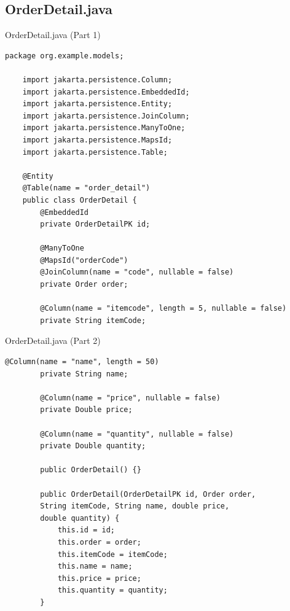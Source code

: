 \documentclass[aspectratio=169, table]{beamer}
\begin{document}
\subsection{OrderDetail.java}
\begin{frame}[fragile]{OrderDetail.java (Part 1)}
\vspace{20pt}
\begin{lstlisting}[style=JavaStyle]
	package org.example.models;
	
	import jakarta.persistence.Column;
	import jakarta.persistence.EmbeddedId;
	import jakarta.persistence.Entity;
	import jakarta.persistence.JoinColumn;
	import jakarta.persistence.ManyToOne;
	import jakarta.persistence.MapsId;
	import jakarta.persistence.Table;
	
	@Entity
	@Table(name = "order_detail")
	public class OrderDetail {
		@EmbeddedId
		private OrderDetailPK id;
		
		@ManyToOne
		@MapsId("orderCode")
		@JoinColumn(name = "code", nullable = false)
		private Order order;
		
		@Column(name = "itemcode", length = 5, nullable = false)
		private String itemCode;
	\end{lstlisting}
\end{frame}

\begin{frame}[fragile]{OrderDetail.java (Part 2)}
	\vspace{20pt}
	\begin{lstlisting}[style=JavaStyle]
		@Column(name = "name", length = 50)
		private String name;
		
		@Column(name = "price", nullable = false)
		private Double price;
		
		@Column(name = "quantity", nullable = false)
		private Double quantity;
		
		public OrderDetail() {}
		
		public OrderDetail(OrderDetailPK id, Order order,
		String itemCode, String name, double price,
		double quantity) {
			this.id = id;
			this.order = order;
			this.itemCode = itemCode;
			this.name = name;
			this.price = price;
			this.quantity = quantity;
		}
	\end{lstlisting}
\end{frame}
\end{document}
